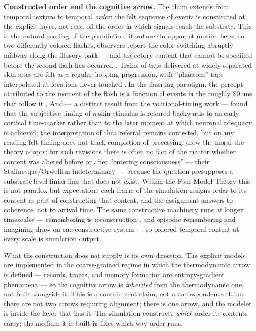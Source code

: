 \documentclass[12pt]{article}
\begin{document}
{\textbf{Constructed order and the cognitive arrow.} The claim extends from temporal texture to temporal \emph{order}: the felt sequence of events is constituted at the explicit layer, not read off the order in which signals reach the substrate. This is the natural reading of the postdiction literature. In apparent motion between two differently colored flashes, observers report the color switching abruptly midway along the illusory path --- mid-trajectory content that cannot be specified before the second flash has occurred \citep{Kolers1976}. Trains of taps delivered at widely separated skin sites are felt as a regular hopping progression, with ``phantom'' taps interpolated at locations never touched \citep{Geldard1972}. In the flash-lag paradigm, the percept attributed to the moment of the flash is a function of events in the roughly 80~ms that follow it \citep{Eagleman2000}. And \citet{Libet1979} --- a distinct result from the volitional-timing work --- found that the subjective timing of a skin stimulus is referred backwards to an early cortical time-marker rather than to the later moment at which neuronal adequacy is achieved; the interpretation of that referral remains contested, but on any reading felt timing does not track completion of processing. \citet{Dennett1992} drew the moral the theory adopts: for such revisions there is often no fact of the matter whether content was altered before or after ``entering consciousness'' --- their Stalinesque/Orwellian indeterminacy --- because the question presupposes a substrate-level finish line that does not exist. Within the Four-Model Theory this is not paradox but expectation: each frame of the simulation assigns order to its content as part of constructing that content, and the assignment answers to coherence, not to arrival time. The same constructive machinery runs at longer timescales --- remembering is reconstruction \citep{Bartlett1932}, and episodic remembering and imagining draw on one constructive system \citep{Schacter2007,Hassabis2007} --- so ordered temporal content at every scale is simulation output.

What the construction does not supply is its own direction. The explicit models are implemented in the coarse-grained regime in which the thermodynamic arrow is defined --- records, traces, and memory formation are entropy-gradient phenomena --- so the cognitive arrow is \emph{inherited} from the thermodynamic one, not built alongside it. This is a containment claim, not a correspondence claim: there are not two arrows requiring alignment; there is one arrow, and the modeler is inside the layer that has it. The simulation constructs \emph{which} order its contents carry; the medium it is built in fixes which way order runs.

}
\end{document}
